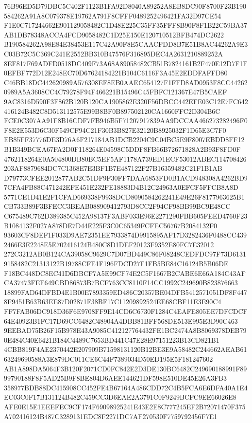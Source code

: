 \documentclass[UTF8,fontset=fandol,zihao=-4,a4paper]{ctexart}
\begin{document}
{{76B96ED5D79DBC5C402F1123B1FA92D8040A89252A8EB8DC90F8700F23B190584262A91A8C079378E19762A791F8CFFF0489252496421FA32D97CE54
F1E0C717244662E901129058482C1D48E225C35FF35FFF8B90F8F1B22C59BA37AB1DB78348ACCA4FCD9058482C1D25E150E120710512BFB474DC2622
B190584262A98E84E38453E117C42A90F8E5CAACFDD8B7E51B8AC44262A9E3C03B72C5C369C241E2552BB310B47576F316895DEC4A2631210889252A
8EF817F69ADFD0518DC409F73A68A89058482CB51B7824161B2F470E12D7F1F0EFBF772D12E248EC70D67624184221B104C6116F3A45E2EDDFAFFD80
C46BB18DC442620989A576308EF8EB0AAEC654127F1FFD8AD0953F8CC442620989A5A3608CC4C79278F94F466221B15496C45FBFC121367E47B5CAEF
9AC8316D590F3F862B120B120CA1905862E320F56DBCC442EFE03C12E7FC642416124B482C8D513112575E99B8BF0B897502120CA1660FFC2D304B6C
FCE0C307AA91F8B16CDF7FB946B5F71207917839AA9DCCAA466273282496F0F8E2E553D6C30F549CF94C21F30B3B827E32120B8925032F1D65E3C7F0
EB85FF37776DE3D76A6F217184AB1DCB2204C9C04BC5E9F8007EBDD8FF12B1B349BCEA67FA2D0F118264E04598C5DDF8FB66B72671828A2B93F8FD0F
4762118264E0A504800DB80BC5EF5AF1178A739ED1ECF53012ABEC114708426203AF8879684DC7C1368E7E3BF1B7E487122F27B16359482C21F1B1AB
D79773CFEE2012877AB2C51DF9F30FF7DAA6853FD0B1ACD948308A4262BD97CFA4FB88C471242EFE451E232FE18883D4B12C24963A0EFCF5FFCB8A8D
5771CE1D41E2F1CFAD669338F9938DCD8090584262241E49E26F8177963625B1CB733B89F3BFECC3BEAB088909412793D8CC2F94CF98BB99BC9E48CC
C675489C762D389385C452A98137F3ABF033E96E2271290FBB605FEED4760F23B1084132F027A878DE7D44E225F3C0C65349FCFEC56767B2084132F0
93603CF8DEF1F033D9AE72351EE7933874D9915895AF17D3282436F0488CC4392466E3E2248E5E702416124B480C8D1DEF20123F9352E80FC7E32012
272C3212AB0B124CA39058C9629C7D07BD449C86F08248CEDFDC97F73D61319158482C21313122B19788CFE1F196FDCD27F1FB5BE84C16124B5B06DE
F18BC448DC8EC41D6DBCF7A5E99CF74E2C5F1667B2CABE6E66A184C43AFCA37473FEF649CBD86873B7BCF763CC8110F14CC1992C249690B823876663
18899FAD64DFBD4E1B00E7893359ED486C20357BE04DFB5412571051DF8F4478F9451B63B63EE87D02871F38BF17C11209892524EE68CBF11E3E90C4
FF7FAB06DC918D36F6E9708FF9E14CD6C6730F1284C4EAFE805EE7DFCDCF64E40923B1FC17D69CC6482C48904A4DBB81BFF568DE513E995E3D90C463
9EEBAD75B26F15B978E43A9085C412127764432FE1BC2474A8B8069378DEB790E484C40E6421B184C4489C7653BD441C47E28E97151223B13CD821B1
4CBB819F4AE2370442E207909B71598131120B12BE3E9A58482C244662AEAB6163249690588A3E879DC011CE6C44F7389034D50ED195E5F181247602
AB1A898DA5064F3B120F2071CD0FC842E2D3DE130BC6482C249690188991F8999790188F8F5AD25B9F8BE804D6AEE144621DF598E510DE45E26A3FB3
358977BDB88DC415908CC452FE4B67164A486CDD72C4B5FCA6E6DFA40A1E4EC03C0F17B131124B482C459CC3D6EAE2A3791C0F9249BCFC9EE66026E8
AFE0E15E1EEEFEC9CF174F69098925241E43E2E8C777245EF2B72071470F375A702416124B487C3289131EDC8F2271DC7AF270530F7759792456F7E1
}}
\end{document}
